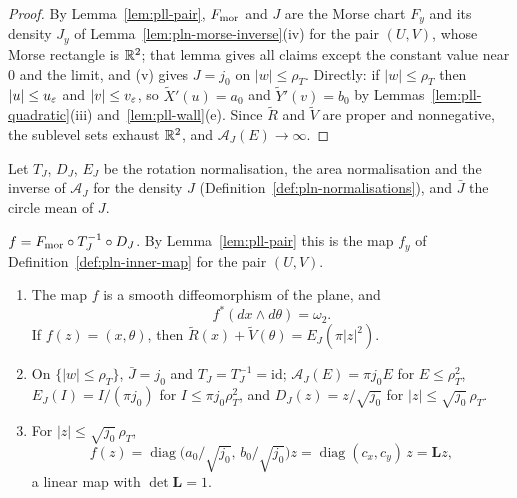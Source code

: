 \begin{proof}
By Lemma~\ref{lem:pll-pair}, $F_{\rm mor}$ and $J$ are the Morse chart $F_y$ and its density $J_y$ of
Lemma~\ref{lem:pln-morse-inverse}(iv) for the pair $(U,V)$, whose Morse rectangle is $\mathbb{R}^2$; that lemma gives all
claims except the constant value near $0$ and the limit, and (v) gives $J=j_0$ on $|w|\le\rho_T$. Directly: if
$|w|\le\rho_T$ then $|u|\le u_\varepsilon$ and $|v|\le v_\varepsilon$, so $\tilde X'(u)=a_0$ and $\tilde Y'(v)=b_0$ by
Lemmas~\ref{lem:pll-quadratic}(iii) and~\ref{lem:pll-wall}(e). Since $\tilde R$ and $\tilde V$ are proper and
nonnegative, the sublevel sets exhaust $\mathbb{R}^2$, and $\mathcal A_J(E)\to\infty$.
\end{proof}

Let $T_J$, $D_J$, $E_J$ be the rotation normalisation, the area normalisation and the inverse of $\mathcal A_J$
for the density $J$ (Definition~\ref{def:pln-normalisations}), and $\bar J$ the circle mean of $J$.

\begin{definition}\label{def:pll-inner-map}
$f=F_{\rm mor}\circ T_J^{-1}\circ D_J$. By Lemma~\ref{lem:pll-pair} this is the map $f_y$ of
Definition~\ref{def:pln-inner-map} for the pair $(U,V)$.
\end{definition}

\begin{proposition}\label{prop:pll-inner-map}
\leavevmode\par
\begin{enumerate}[label=(\alph*)]
\item The map $f$ is a smooth diffeomorphism of the plane, and
 \[
  f^*(dx\wedge d\theta)=\omega_2.
 \]
 If $f(z)=(x,\theta)$, then $\tilde R(x)+\tilde V(\theta)=E_J(\pi|z|^2)$.
\item On $\{|w|\le\rho_T\}$, $\bar J=j_0$ and $T_J=T_J^{-1}=\mathrm{id}$; $\mathcal A_J(E)=\pi j_0E$ for
 $E\le\rho_T^2$, $E_J(I)=I/(\pi j_0)$ for $I\le\pi j_0\rho_T^2$, and $D_J(z)=z/\sqrt{j_0}$ for
 $|z|\le\sqrt{j_0}\,\rho_T$.
\item For $|z|\le\sqrt{j_0}\,\rho_T$,
 \[
  f(z)=\operatorname{diag}\bigl(a_0/\sqrt{j_0},\,b_0/\sqrt{j_0}\bigr)z=\operatorname{diag}(c_x,c_y)\,z=\mathbf Lz,
 \]
 a linear map with $\det\mathbf L=1$.
\end{enumerate}
\end{proposition}

